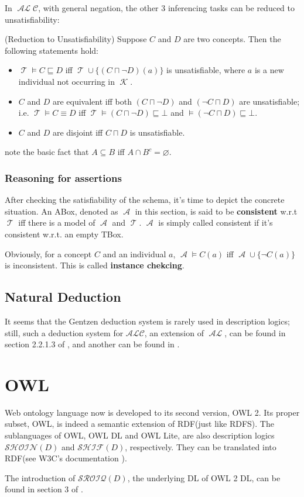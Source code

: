 \documentclass{article}
\DeclareMathOperator{\al}{\mathcal{AL}}
\DeclareMathOperator{\kb}{\mathcal{K}}
\DeclareMathOperator{\tbox}{\mathcal{T}}
\DeclareMathOperator{\abox}{\mathcal{A}}
\begin{document}
In $\al\mathcal{C}$, with general negation, the other 3 inferencing tasks can be reduced to unsatisfiability:
\begin{pro}(Reduction to Unsatisfiability)\newline
Suppose $C$ and $D$ are two concepts. Then the following statements hold:
\begin{itemize}
\item $\tbox \vDash C \sqsubseteq D$ iff $\tbox\cup \{(C \sqcap \neg D)(a)\}$ is unsatisfiable, where $a$ is a new individual not occurring in $\kb$.
\item $C$ and $D$ are equivalent iff both $(C \sqcap \neg D)$ and $(\neg C \sqcap D)$ are unsatisfiable; i.e. $\tbox \vDash C \equiv D$ iff $\tbox\vDash (C \sqcap \neg D)\sqsubseteq \bot $ and $\vDash (\neg C \sqcap D) \sqsubseteq \bot$.
\item $C$ and $D$ are disjoint iff $C \sqcap D$ is unsatisfiable.
\end{itemize}
\end{pro}
note the basic fact that $A \subseteq B$ iff $A \cap B^c =\varnothing$.	

\subsubsection{Reasoning for assertions}
After checking the satisfiability of the schema, it's time to depict the concrete situation. An ABox, denoted as $\abox$ in this section, is said to be \textbf{consistent} w.r.t $\tbox$ iff there is a model of $\abox$ and $\tbox$. $\abox$ is simply called consistent if it's consistent w.r.t. an empty TBox.\newline

Obviously, for a concept $C$ and an individual $a$, $\abox \vDash C(a)$ iff $\abox \cup \{\neg C(a)\}$ is inconsistent. This is called \textbf{instance chekcing}.

\subsection{Natural Deduction}
It seems that the Gentzen deduction system is rarely used in description logics; still, such a deduction system for $\mathcal{ALC}$, an extension of $\al$, can be found in section 2.2.1.3 of \cite{proof}, and another can be found in \cite{rademaker2012proof}.\newline

\section{OWL}
Web ontology language now is developed to its second version, OWL 2.  Its proper subset, OWL, is indeed a semantic extension of RDF(just like RDFS). The sublanguages of OWL, OWL DL and OWL Lite, are also description logics $\mathcal{SHOIN}(D)$ and $\mathcal{SHIF}(D)$, respectively. They can be translated into RDF(see W3C's documentation \cite{OWL2RDF}).\newline 

The introduction of $\mathcal{SROIQ}(D)$, the underlying DL of OWL 2 DL, can be found in section 3 of \cite{primer}.


\end{document}
